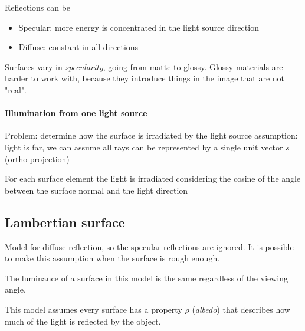 \documentclass{article}
\begin{document}
Reflections can be
\begin{itemize}
    \item Specular: more energy is concentrated in the light source direction
    \item Diffuse: constant in all directions
\end{itemize}
Surfaces vary in \textit{specularity}, going from matte to glossy. Glossy materials are harder to work with, because they introduce things in the image that are not "real".

\paragraph{Illumination from one light source}
Problem: determine how the surface is irradiated by the light source
assumption: light is far, we can assume all rays can be represented by a single unit vector $s$ (ortho projection)

For each surface element the light is irradiated considering the cosine of the angle between the surface normal and the light direction

\subsection{Lambertian surface}
Model for diffuse reflection, so the specular reflections are ignored. It is possible to make this assumption when the surface is rough enough.

The luminance of a surface in this model is the same regardless of the viewing angle.

This model assumes every surface has a property $\rho$ (\textit{albedo}) that describes how much of the light is reflected by the object.
\end{document}
